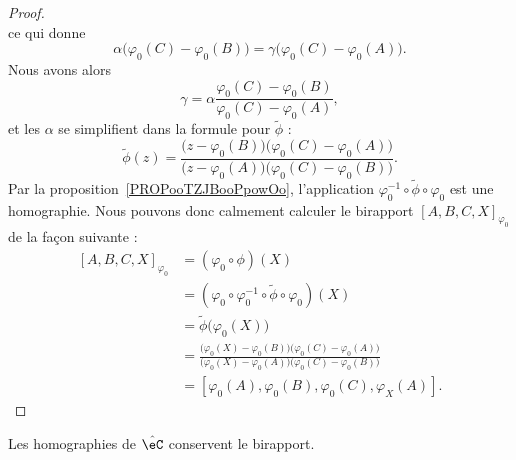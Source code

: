 \begin{proof}
\begin{equation}
	\end{equation}
	ce qui donne
	\begin{equation}
		\alpha\big( \varphi_0(C)-\varphi_0(B) \big)=\gamma\big( \varphi_0(C)-\varphi_0(A) \big).
	\end{equation}
	Nous avons alors
	\begin{equation}
		\gamma=\alpha\frac{ \varphi_0(C)-\varphi_0(B) }{ \varphi_0(C)-\varphi_0(A) },
	\end{equation}
	et les \( \alpha\) se simplifient dans la formule pour \( \tilde \phi\) :
	\begin{equation}
		\tilde \phi(z)=\frac{ \big( z- \varphi_0(B)   \big)\big( \varphi_0(C)-\varphi_0(A) \big) }{ \big( z-\varphi_0(A)\big)\big( \varphi_0(C)-\varphi_0(B) \big) }.
	\end{equation}
	Par la proposition~\ref{PROPooTZJBooPpowOo}, l'application \( \varphi_0^{-1}\circ\tilde \phi\circ\varphi_0\) est une homographie. Nous pouvons donc calmement calculer le birapport \( [A,B,C,X]_{\varphi_0}\) de la façon suivante :
	\begin{subequations}
		\begin{align}
			[A,B,C,X]_{\varphi_0} & =(\varphi_0\circ\phi)(X)                                                                                                                                           \\
			                      & =(\varphi_0\circ\varphi_0^{-1}\circ\tilde \phi\circ\varphi_0)(X)                                                                                                   \\
			                      & =\tilde \phi\big( \varphi_0(X) \big)                                                                                                                               \\
			                      & =\frac{ \big( \varphi_0(X)-\varphi_0(B) \big)\big( \varphi_0(C)-\varphi_0(A) \big) }{ \big( \varphi_0(X)-\varphi_0(A) \big)\big( \varphi_0(C)-\varphi_0(B) \big) } \\
			                      & =[\varphi_0(A),\varphi_0(B),\varphi_0(C),\varphi_X(A)].
		\end{align}
	\end{subequations}
\end{proof}

\begin{proposition}     \label{PROPooQGPFooReNaGq}
	Les homographies de \( \hat \eC\) conservent le birapport.
\end{proposition}

